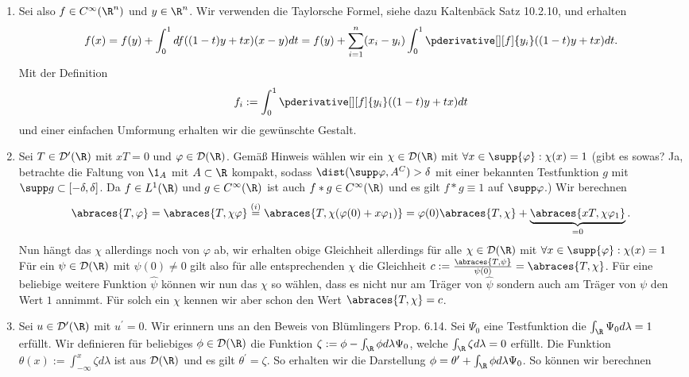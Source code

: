 \begin{solution}
\phantom{}
\begin{enumerate}[label = (\roman*)]
	\item Sei also $f \in C^\infty(\R^n)$ und $y \in \R^n$. Wir verwenden die Taylorsche Formel, siehe dazu Kaltenbäck Satz 10.2.10, und erhalten
	\begin{align*}
	f(x) = f(y) + \int_0^1 df((1-t)y + tx)(x - y) dt = f(y) + \sum_{i = 1}^n (x_i - y_i) \int_0^1 \pderivative[][f]{y_i} ((1-t)y + tx) dt.
	\end{align*}
	Mit der Definition
	\begin{align*}
	f_i := \int_0^1  \pderivative[][f]{y_i} ((1-t)y + tx) dt
	\end{align*}
	und einer einfachen Umformung erhalten wir die gewünschte Gestalt.
	\item Sei $T \in \mathcal{D}^\prime(\R)$ mit $xT = 0$ und $\varphi \in \mathcal{D}(\R)$. Gemäß Hinweis wählen wir ein $\chi \in \mathcal{D}(\R)$ mit $\forall x \in \supp{\varphi}: \chi(x) = 1$ (gibt es sowas?
  Ja, betrachte die Faltung von $\1_A$ mit $A \subset \R$ kompakt, sodass $\dist(\supp \varphi, A^C) > \delta$ mit einer bekannten Testfunktion $g$ mit $\supp g \subset [-\delta, \delta]$.
  Da $f \in L^1(\R)$ und $g \in C^{\infty}(\R)$ ist auch $f*g \in C^{\infty}(\R)$ und es gilt $f*g \equiv 1$ auf $\supp \varphi$.) Wir berechnen
	\begin{align*}
	\abraces{T,\varphi} = \abraces{T, \chi \varphi} \stackrel{(i)}{=} \abraces{T, \chi (\varphi(0) + x\varphi_1)} = \varphi(0) \abraces{T, \chi} + \underbrace{\abraces{xT, \chi \varphi_1}}_{=0}.
	\end{align*}
	Nun hängt das $\chi$ allerdings noch von $\varphi$ ab, wir erhalten obige Gleichheit allerdings für alle $\chi \in \mathcal{D}(\R)$ mit $\forall x \in \supp{\varphi}: \chi(x) = 1$ Für ein $\psi \in \mathcal{D}(\R)$ mit $\psi(0) \neq 0$ gilt also für alle entsprechenden $\chi$ die Gleichheit $c := \frac{\abraces{T,\psi}}{\psi(0)} = \abraces{T, \chi}$. Für eine beliebige weitere Funktion $\hat{\psi}$ können wir nun das $\chi$ so wählen, dass es nicht nur am Träger von $\hat{\psi}$ sondern auch am Träger von $\psi$ den Wert $1$ annimmt. Für solch ein $\chi$ kennen wir aber schon den Wert $\abraces{T, \chi} = c$. 
	\item Sei $u \in \mathcal{D}^\prime(\R)$ mit $u^\prime = 0$. Wir erinnern uns an den Beweis von Blümlingers Prop. 6.14. Sei $\Psi_0$ eine Testfunktion die $\int_\R \Psi_0 d\lambda = 1$ erfüllt. Wir definieren für beliebiges $\phi \in \mathcal{D}(\R)$ die Funktion $\zeta := \phi - \int_\R \phi d\lambda \Psi_0$, welche $\int_\R \zeta d\lambda = 0$ erfüllt. Die Funktion $\theta(x) := \int_{-\infty}^{x} \zeta d\lambda$ ist aus $\mathcal{D}(\R)$ und es gilt $\theta^\prime = \zeta$. So erhalten wir die Darstellung $\phi = \theta^\prime + \int_\R \phi d\lambda \Psi_0$. So können wir berechnen

\end{enumerate}
\end{solution}
